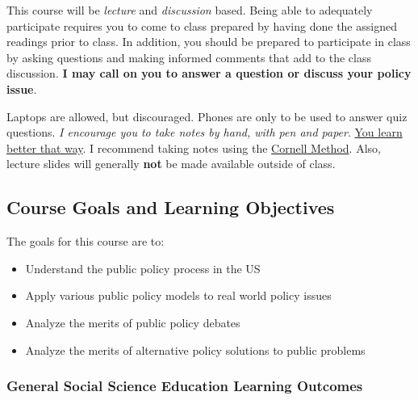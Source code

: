 \vspace{0.1in}

\noindent This course will be \emph{lecture} and \emph{discussion}
based. Being able to adequately participate requires you to come to
class prepared by having done the assigned readings prior to class. In
addition, you should be prepared to participate in class by asking
questions and making informed comments that add to the class discussion.
\textbf{I may call on you to answer a question or discuss your policy
issue}.

\vspace{0.1in}

\noindent Laptops are allowed, but discouraged. Phones are only to be
used to answer quiz questions. \emph{I encourage you to take notes by
hand, with pen and paper}.
\href{https://www.nytimes.com/2017/11/27/learning/should-teachers-and-professors-ban-student-use-of-laptops-in-class.html}{You
learn better that way}. I recommend taking notes using the
\href{http://www.usu.edu/arc/idea_sheets/pdf/note_taking_cornell.pdf}{Cornell
Method}. Also, lecture slides will generally \textbf{not} be made
available outside of class.

\hypertarget{course-goals-and-learning-objectives}{%
\subsection{Course Goals and Learning
Objectives}\label{course-goals-and-learning-objectives}}

The goals for this course are to:

\begin{itemize}
\item
  Understand the public policy process in the US
\item
  Apply various public policy models to real world policy issues
\item
  Analyze the merits of public policy debates
\item
  Analyze the merits of alternative policy solutions to public problems
\end{itemize}

\hypertarget{general-social-science-education-learning-outcomes}{%
\subsubsection{General Social Science Education Learning
Outcomes}\label{general-social-science-education-learning-outcomes}}

